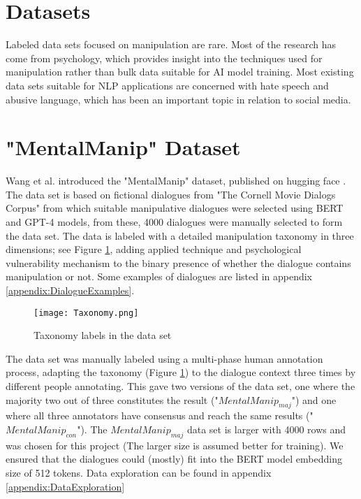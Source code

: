 \documentclass[
	letterpaper, %
	12pt, %
	unnumberedsections, %
	twoside, %
]{LTJournalArticle}
\begin{document}
\section{Datasets}
Labeled data sets focused on manipulation are rare. Most of the research has come from psychology, which provides insight into the techniques used for manipulation rather than bulk data suitable for AI model training. Most existing data sets suitable for NLP applications are concerned with hate speech and abusive language, which has been an important topic in relation to social media.

\section{"MentalManip" Dataset}
Wang et al. \cite{MentalManip} introduced the "MentalManip" dataset, published on hugging face \cite{MentalManipDataset}. The data set is based on fictional dialogues from "The Cornell Movie Dialogs Corpus" \cite{CornellMovieCorpus} from which suitable manipulative dialogues were selected using BERT and GPT-4 models, from these, 4000 dialogues were manually selected to form the data set. The data is labeled with a detailed manipulation taxonomy in three dimensions; see Figure \ref{fig:Taxonomy}, adding applied technique and psychological vulnerability mechanism to the binary presence of whether the dialogue contains manipulation or not. Some examples of dialogues are listed in appendix \ref{appendix:DialogueExamples}.

\begin{figure}[!htp] %
	\centering
	\texttt{[image: Taxonomy.png]}
	\caption{Taxonomy labels in the data set}
	\label{fig:Taxonomy}
\end{figure}

The data set was manually labeled using a multi-phase human annotation process, adapting the taxonomy (Figure \ref{fig:Taxonomy}) to the dialogue context three times by different people annotating. This gave two versions of the data set, one where the majority two out of three constitutes the result ("$MentalManip_{maj}$") and one where all three annotators have consensus and reach the same results ("$MentalManip_{con}$"). The $MentalManip_{maj}$ data set is larger with 4000 rows and was chosen for this project (The larger size is assumed better for training). We ensured that the dialogues could (mostly) fit into the BERT model embedding size of 512 tokens.
Data exploration can be found in appendix \ref{appendix:DataExploration}
\end{document}
